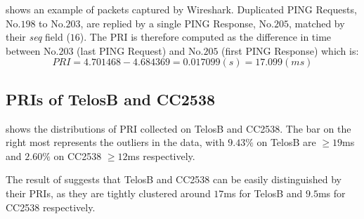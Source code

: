 \begin{example}


 shows an example of packets captured by Wireshark\cite{Wireshark}. Duplicated PING Requests, No.$198$ to No.$203$, are replied by a single PING Response, No.$205$, matched by their \textit{seq} field ($16$). The PRI is therefore computed as the difference in time between No.$203$ (last PING Request) and No.$205$ (first PING Response) which is:
\begin{equation*}
PRI = 4.701468 - 4.684369 = 0.017099(s) = 17.099(ms)
\end{equation*}
\end{example}

\subsection{PRIs of TelosB and CC2538} \label{PRI_Devices}

 shows the distributions of PRI collected on TelosB and CC2538. The bar on the right most represents the outliers in the data, with $9.43\%$ on TelosB are $\geq 19$ms and $2.60\%$ on CC2538 $\geq 12$ms respectively. 

The result of  suggests that TelosB and CC2538 can be easily distinguished by their PRIs, as they are tightly clustered around $17$ms for TelosB and $9.5$ms for CC2538 respectively.

